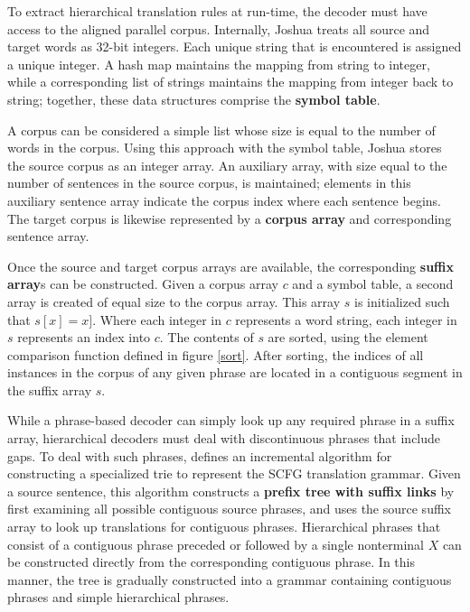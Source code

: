 \documentclass{pbml}
\begin{document}
To extract hierarchical translation rules at run-time, the decoder must have access to the aligned parallel corpus. Internally, Joshua treats all source and target words as 32-bit integers. Each unique string that is encountered is assigned a unique integer. A hash map maintains the mapping from string to integer, while a corresponding list of strings maintains the mapping from integer back to string; together, these data structures comprise the {\bf symbol table}.

A corpus can be considered a simple list whose size is equal to the number of words in the corpus. Using this approach with the symbol table, Joshua stores the source corpus as an integer array. An auxiliary array, with size equal to the number of sentences in the source corpus, is maintained; elements in this auxiliary sentence array indicate the corpus index where each sentence begins. The target corpus is likewise represented by a {\bf corpus array} and corresponding sentence array.

Once the source and target corpus arrays are available, the corresponding {\bf suffix array}s can be constructed. Given a corpus array $c$ and a symbol table, a second array is created of equal size to the corpus array. This array $s$ is initialized such that $s[x] = x]$. Where each integer in $c$ represents a word string, each integer in $s$ represents an index into $c$. The contents of $s$ are sorted, using the element comparison function defined in figure \ref{sort}. After sorting, the indices of all instances in the corpus of any given phrase are located in a contiguous segment in the suffix array $s$.

While a phrase-based decoder can simply look up any required phrase in a suffix array, hierarchical decoders must deal with discontinuous phrases that include gaps. To deal with such phrases,  defines an incremental algorithm for constructing a specialized trie \cite{Fredkin1960} to represent the SCFG translation grammar. Given a source sentence, this algorithm constructs a {\bf prefix tree with suffix links} by first examining all possible contiguous source phrases, and uses the source suffix array to look up translations for contiguous phrases. Hierarchical phrases that consist of a contiguous phrase preceded or followed by a single nonterminal $X$ can be constructed directly from the corresponding contiguous phrase. In this manner, the tree is gradually constructed into a grammar containing contiguous phrases and simple hierarchical phrases. 
\end{document}
